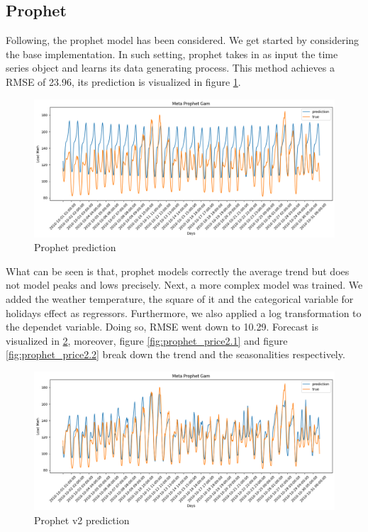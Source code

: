 \subsection{Prophet}
Following, the prophet model has been considered. 
We get started by considering the base implementation. In such setting, prophet takes in as input the time series object and learns its data generating process.
This method achieves a RMSE of 23.96, its prediction is visualized in figure \ref{fig:prophet_price_1}.
\begin{figure}[!h]
    \includegraphics[width=\textwidth]{images/prophet_price_1.png}
    \caption{Prophet prediction}
    \label{fig:prophet_price_1}
\end{figure}
What can be seen is that, prophet models correctly the average trend but does not model peaks and lows precisely. 
Next, a more complex model was trained. We added the weather temperature, the square of it and the categorical variable for holidays effect as regressors. Furthermore, we also applied a log transformation to the dependet variable. Doing so, RMSE went down to 10.29. Forecast is visualized in \ref{fig:prophet_price2}, moreover, figure \ref{fig:prophet_price2.1} and figure \ref{fig:prophet_price2.2} break down the trend and the seasonalities respectively.
\begin{figure}[!h]
    \includegraphics[width=\textwidth]{images/prophet_price2.png}
    \caption{Prophet v2 prediction}
    \label{fig:prophet_price2}
\end{figure}

